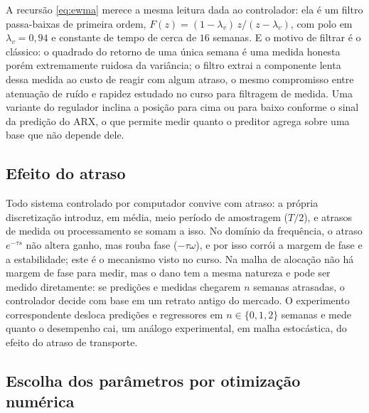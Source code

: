 \documentclass[conference]{IEEEtran}
\begin{document}
A recursão \eqref{eq:ewma} merece a mesma leitura dada ao controlador: ela é um filtro passa-baixas de primeira ordem, $F(z) = (1-\lambda_v)\,z/(z-\lambda_v)$, com polo em $\lambda_v = 0{,}94$ e constante de tempo de cerca de $16$ semanas. E o motivo de filtrar é o clássico: o quadrado do retorno de uma única semana é uma medida honesta porém extremamente ruidosa da variância; o filtro extrai a componente lenta dessa medida ao custo de reagir com algum atraso, o mesmo compromisso entre atenuação de ruído e rapidez estudado no curso para filtragem de medida. Uma variante do regulador inclina a posição para cima ou para baixo conforme o sinal da predição do ARX, o que permite medir quanto o preditor agrega sobre uma base que não depende dele.

\subsection{Efeito do atraso}\label{sec:teoria-atraso}

Todo sistema controlado por computador convive com atraso: a própria discretização introduz, em média, meio período de amostragem ($T/2$), e atrasos de medida ou processamento se somam a isso. No domínio da frequência, o atraso $e^{-\tau s}$ não altera ganho, mas rouba fase ($-\tau\omega$), e por isso corrói a margem de fase e a estabilidade; este é o mecanismo visto no curso. Na malha de alocação não há margem de fase para medir, mas o dano tem a mesma natureza e pode ser medido diretamente: se predições e medidas chegarem $n$ semanas atrasadas, o controlador decide com base em um retrato antigo do mercado. O experimento correspondente desloca predições e regressores em $n \in \{0,1,2\}$ semanas e mede quanto o desempenho cai, um análogo experimental, em malha estocástica, do efeito do atraso de transporte.

\subsection{Escolha dos parâmetros por otimização numérica}\label{sec:teoria-otim}
\end{document}
